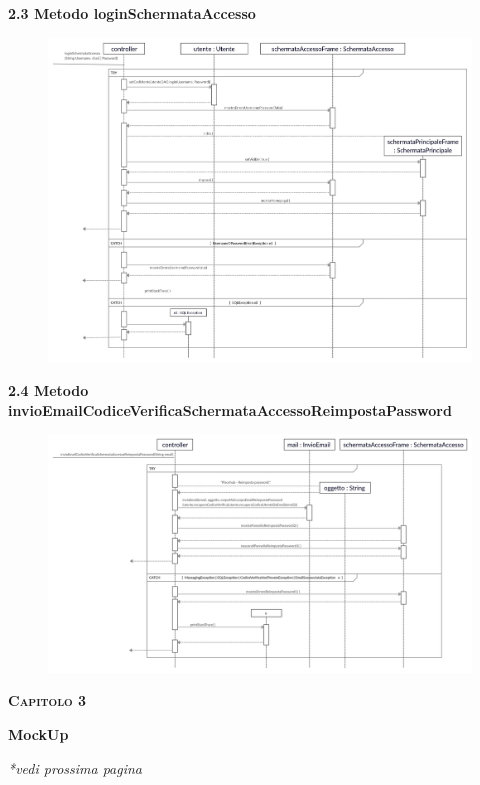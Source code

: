 \documentclass[a4paper,12pt]{article}
\begin{document}
\newpage\null{}\setcounter{page}{7}
\begin{flushleft}
\vspace*{+1cm}
{\bf\normalsize 2.3 Metodo loginSchermataAccesso }
\begin{center}
	\begin{figure}[h]
	\centering
 	\includegraphics[width=1\textwidth]{loginSchermataAccesso.jpg}
	\end{figure}
\end{center}
\end{flushleft}
\newpage

\newpage\null{}\setcounter{page}{8}
\begin{flushleft}
\vspace*{+2cm}
{\bf\normalsize 2.4 Metodo invioEmailCodiceVerificaSchermataAccessoReimpostaPassword }
\begin{center}
	\begin{figure}[h]
	\centering
 	\includegraphics[width=1\textwidth]{invioEmailCodiceVerificaSchermataAccessoReimpostaPassword.jpg}
	\end{figure}
\end{center}
\end{flushleft}
\newpage

\newpage\null{}\setcounter{page}{9}
\vspace*{+1cm}
\Large\textsc{\bf Capitolo 3}
\vspace*{+1cm}

\begingroup
\fontsize{35pt}{12pt}\selectfont\bf{MockUp}
\endgroup
\vspace*{+2cm}
\begin{center}
\normalsize{\it{*vedi prossima pagina}}
\end{center}

\newpage
\end{document}
